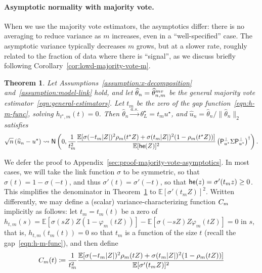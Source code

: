 \documentclass[11pt]{article}
\newcommand{\E}{\mathbb{E}}
\newcommand{\prn}[1]{\left({#1}\right)} %
\newcommand{\what}[1]{\widehat{#1}}
\newcommand{\normal}{\mathsf{N}}
\newcommand{\mv}{^{\textup{mv}}}
\newcommand{\proj}{\mathsf{P}}
\newcommand{\projperp}{\proj_{u\opt}^\perp}
\newcommand{\norms}[1]{\|{#1}\|} %
\newcommand{\ltwos}[1]{\norms{#1}_2} %
\newcommand{\<}{\langle} %
\renewcommand{\>}{\rangle}
\newcommand{\cd}{\rightsquigarrow}
\newcommand{\cas}{\stackrel{a.s.}{\rightarrow}}
\newcommand{\defeq}{\coloneqq}
\newcommand{\opt}{^\star}
\newcommand{\mve}{\what{\theta}\mv_{n,m}} %
\newtheorem{theorem}{Theorem}
\begin{document}
\paragraph{Asymptotic normality with majority vote.}
When we use the majority vote estimators, the asymptotics differ: there is
no averaging to reduce variance as $m$ increases, even in a
``well-specified'' case. The asymptotic variance typically decreases
$m$ grows, but at a slower rate, roughly related to
the fraction of data where there is ``signal'', as we discuss
briefly following Corollary~\ref{cor:lowd-majority-vote-m}.
\begin{theorem}
  \label{theorem:majority-vote-asymptotics}
  Let Assumptions~\ref{assumption:x-decomposition}
  and~\ref{assumption:model-link} hold, and let $\what{\theta}_n = \mve$ be
  the general majority vote
  estimator~\eqref{eqn:general-estimators}. Let $t_m$ be
  the zero of the gap function~\eqref{eqn:h-m-func}, solving
  $h_{t\opt,m} (t) = 0$.  Then $\what{\theta}_n \cas
  \theta\opt_L = t_m u\opt$, and $\what{u}_n = \what{\theta}_n /
  \ltwos{\what{\theta}_n}$ satisfies
  \begin{equation*}
    \sqrt{n} \left(\what{u}_n - u\opt\right)
    \cd \normal\left(0, \frac{1}{t_m^2}
    \frac{\E[\sigma(-t_m |Z|)^2 \rho_m(t\opt Z) + \sigma(t_m |Z|)^2
	(1 - \rho_m(t\opt Z))]}{\E[\hessfunc(Z)]^2}
    \prn{\projperp \Sigma \projperp}^\dagger \right).
	\end{equation*}
\end{theorem}
\noindent
We defer the proof to Appendix~\ref{sec:proof-majority-vote-asymptotics}. In most cases, we will take the link function $\sigma$ to be symmetric,
so that $\sigma(t) = 1 - \sigma(-t)$, and thus $\sigma'(t) = \sigma'(-t)$,
so that $\mathsf{he}(z) = \sigma'(t_m z) \ge 0$. This simplifies the denominator
in Theorem~\ref{theorem:majority-vote-asymptotics} to
$\E[\sigma'(t_m Z)]^2$.
Written differently, we may define a (scalar) variance-characterizing
function $C_m$ implicitly as follows: let $t_m = t_m(t)$ be a
zero of $h_{t,m}(s) =
\E[\sigma(sZ) Z (1 - \varphi_m(t Z))] - \E[\sigma(-s Z) Z \varphi_m(t Z)]
= 0$ in $s$, that is, $h_{t,m}(t_m(t)) = 0$ so that $t_m$
is a function of the size $t$ (recall the gap~\eqref{eqn:h-m-func}), and
then define
\begin{equation}
  \label{eqn:generic-majority-covariance}
  \varfunc(t) \defeq \frac{1}{t_m^2} \frac{\E[\sigma(-t_m |Z|)^2
      \rho_m(t Z) + \sigma(t_m |Z|)^2 (1 - \rho_m(t Z))]}{
    \E[\sigma'(t_m Z)]^2}
\end{equation}
\end{document}

